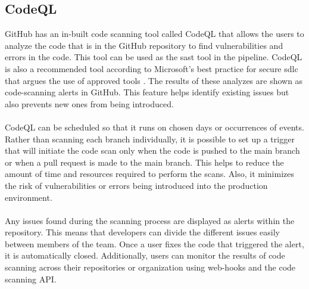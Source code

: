 \subsection{CodeQL}
GitHub has an in-built code scanning tool called CodeQL that allows the users to analyze the code that is in the GitHub repository to find vulnerabilities and errors in the code. This tool can be used as the \acrshort{sast} tool in the \gls{pipeline}. CodeQL is also a recommended tool according to Microsoft's best practice for secure \acrshort{sdlc} that argues the use of approved tools \cite{microsoftSDLCpractices}. The results of these analyzes are shown as code-scanning alerts in GitHub. This feature helps identify existing issues but also prevents new ones from being introduced. \cite{CodeQL1}
\\~\\
CodeQL can be scheduled so that it runs on chosen days or occurrences of events. Rather than scanning each branch individually, it is possible to set up a trigger that will initiate the code scan only when the code is pushed to the main branch or when a pull request is made to the main branch. This helps to reduce the amount of time and resources required to perform the scans. Also, it minimizes the risk of vulnerabilities or errors being introduced into the production environment.
\\~\\
Any issues found during the scanning process are displayed as alerts within the repository. This means that developers can divide the different issues easily between members of the team.  Once a user fixes the code that triggered the alert, it is automatically closed. Additionally, users can monitor the results of code scanning across their repositories or organization using web-hooks and the code scanning API. 
\cite{GithubCodeScanning}

